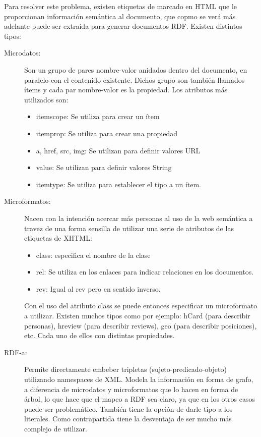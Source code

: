 Para resolver este problema, existen etiquetas de marcado en HTML que le proporcionan información semántica al documento, que copmo se verá más adelante 
puede ser extraída para generar documentos RDF. Existen distintos tipos:
\begin{description}
  \item[Microdatos:] Son un grupo de pares nombre-valor anidados dentro del documento, en paralelo con el contenido existente. Dichos grupo son 
también llamados ítems y cada par nombre-valor es la propiedad. Los atributos más utilizados son:
  \begin{itemize}
    \item itemscope: Se utiliza para crear un ítem
    \item itemprop: Se utiliza para crear una propiedad
    \item a, href, src, img: Se utilizan para definir valores URL
    \item value: Se utilizan para definir valores String
    \item itemtype: Se utiliza para establecer el tipo a un ítem.
  \end{itemize}

  \item[Microformatos:] Nacen con la intención acercar más personas al uso de la web semántica a travez de una forma sensilla de utilizar 
una serie de atributos de las etiquetas de XHTML:

  \begin{itemize}
    \item class: especifica el nombre de la clase

    \item rel: Se utiliza en los enlaces para indicar relaciones en los documentos.

    \item rev: Igual al rev pero en sentido inverso.
  \end{itemize}
  
Con el uso del atributo class se puede entonces especificar un microformato a utilizar. Existen muchos tipos como por ejemplo: hCard (para describir 
personas), hreview (para describir reviews), geo (para describir posiciones), etc. Cada uno de ellos con distintas propiedades.

\item[RDF-a:] Permite directamente embeber tripletas (sujeto-predicado-objeto) utilizando namespaces de XML. Modela la información en forma de grafo, 
a diferencia de microdatos y microformatos que lo hacen en forma de árbol, lo que hace que el mapeo a RDF sea claro, ya que en los otros casos puede ser problemático.
También tiene la opción de darle tipo a los literales. Como contrapartida tiene la desventaja de ser mucho más complejo de utilizar. 
\end{description}


